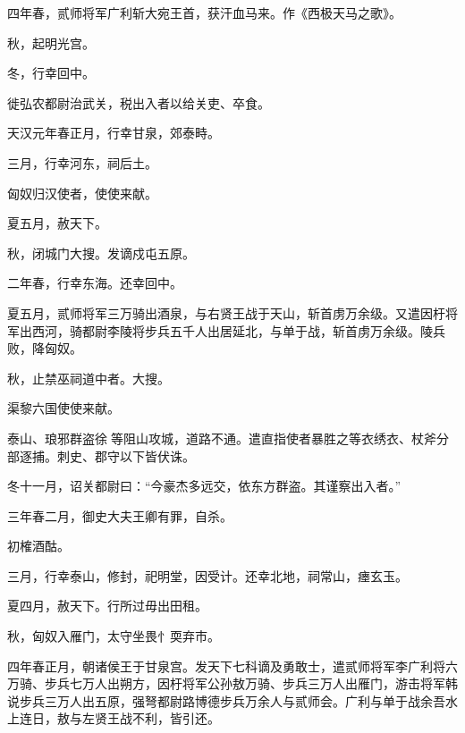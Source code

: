 \documentclass[12pt,UTF8]{ctexbook}
\begin{document}
四年春，贰师将军广利斩大宛王首，获汗血马来。作《西极天马之歌》。



秋，起明光宫。



冬，行幸回中。



徙弘农都尉治武关，税出入者以给关吏、卒食。



天汉元年春正月，行幸甘泉，郊泰畤。



三月，行幸河东，祠后土。



匈奴归汉使者，使使来献。



夏五月，赦天下。



秋，闭城门大搜。发谪戍屯五原。



二年春，行幸东海。还幸回中。



夏五月，贰师将军三万骑出酒泉，与右贤王战于天山，斩首虏万余级。又遣因杅将军出西河，骑都尉李陵将步兵五千人出居延北，与单于战，斩首虏万余级。陵兵败，降匈奴。



秋，止禁巫祠道中者。大搜。



渠黎六国使使来献。



泰山、琅邪群盗徐等阻山攻城，道路不通。遣直指使者暴胜之等衣绣衣、杖斧分部逐捕。刺史、郡守以下皆伏诛。



冬十一月，诏关都尉曰：“今豪杰多远交，依东方群盗。其谨察出入者。”



三年春二月，御史大夫王卿有罪，自杀。



初榷酒酤。



三月，行幸泰山，修封，祀明堂，因受计。还幸北地，祠常山，瘗玄玉。



夏四月，赦天下。行所过毋出田租。



秋，匈奴入雁门，太守坐畏忄耎弃市。



四年春正月，朝诸侯王于甘泉宫。发天下七科谪及勇敢士，遣贰师将军李广利将六万骑、步兵七万人出朔方，因杅将军公孙敖万骑、步兵三万人出雁门，游击将军韩说步兵三万人出五原，强弩都尉路博德步兵万余人与贰师会。广利与单于战余吾水上连日，敖与左贤王战不利，皆引还。
\end{document}
